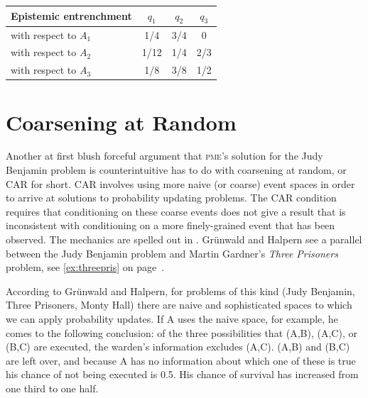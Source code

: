 \documentclass[phd,12pt,oneside]{ubcthesis}
\begin{document}
\begin{tabular}{|l|c|c|c|}\hline
Epistemic entrenchment & $q_{1}$ & $q_{2}$ & $q_{3}$ \\ \hline
with respect to $A_{1}$ & 1/4 & 3/4 & 0 \\ \hline
with respect to $A_{2}$ & 1/12 & 1/4 & 2/3 \\ \hline
with respect to $A_{3}$ & 1/8 & 3/8 & 1/2 \\ \hline
\end{tabular}

\section{Coarsening at Random}
\label{sec:ahdiesho}

Another at first blush forceful argument that \textsc{pme}'s solution
for the Judy Benjamin problem is counterintuitive has to do with
coarsening at random, or CAR for short. CAR involves using more naive
(or coarse) event spaces in order to arrive at solutions to
probability updating problems. The CAR condition requires that
conditioning on these coarse events does not give a result that is
inconsistent with conditioning on a more finely-grained event that has
been observed. The mechanics are spelled out in
. Gr{\"u}nwald and Halpern see a
parallel between the Judy Benjamin problem and Martin Gardner's
\emph{Three Prisoners} problem, see {\xample} \ref{ex:threepris} on
page~\pageref{page:iabeiwet}.


According to Gr{\"u}nwald and Halpern, for problems of this kind (Judy
Benjamin, Three Prisoners, Monty Hall) there are naive and
sophisticated spaces to which we can apply probability updates. If A
uses the naive space, for example, he comes to the following
conclusion: of the three possibilities that (A,B), (A,C), or (B,C) are
executed, the warden's information excludes (A,C). (A,B) and (B,C) are
left over, and because A has no information about which one of these
is true his chance of not being executed is 0.5. His chance of
survival has increased from one third to one half. 
\end{document}
